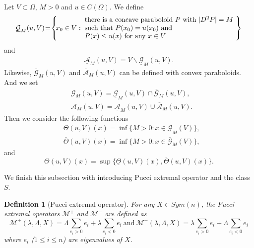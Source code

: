 \documentclass[11pt, reqno]{amsart}
\newtheorem{definition}[theorem]{Definition}
\numberwithin{equation}{section}
\begin{document}
Let $V \subset \Omega $, $M>0 $ and $u \in C(\Omega) $.
We define
\begin{align*}
 \underline{\mathcal{G}}_{M}(u, V) \hspace{-0.2em}=\hspace{-0.2em} \left\{ \hspace{-0.2em} x_{0} \in V : \hspace{-0.2em}  \begin{array}{ll}
 \textrm{there is a concave paraboloid $P$ with $|D^{2}P|=M$}\\
\textrm{such that $P(x_{0})=u(x_{0})$ and}\\
\textrm{$P(x)\le u(x)$ for any $x \in V$}
\end{array} \hspace{-0.2em}  \right\}
\end{align*}and
\begin{align*}
\underline{\mathcal{A}}_{M}(u, V) = V \backslash \underline{\mathcal{G}}_{M}(u, V) .
\end{align*}
Likewise, $ \overline{\mathcal{G}}_{M}(u, V)$ and $\overline{\mathcal{A}}_{M}(u, V) $ can be defined with convex paraboloids.
And we set
\begin{align*}&\mathcal{G}_{M}(u,V) =  \underline{\mathcal{G}}_{M}(u, V)  \cap \overline{\mathcal{G}}_{M}(u, V), \\
& \mathcal{A}_{M}(u,V)  =  \underline{\mathcal{A}}_{M}(u, V)  \cup \overline{\mathcal{A}}_{M}(u, V).
\end{align*}
Then we consider the following functions
\begin{align*} &\underline{\Theta}(u,V)(x) = \inf \{ M>0 :x \in \underline{\mathcal{G}}_{M}(V) \},
\\ & \overline{\Theta}(u,V)(x) = \inf \{ M>0 :x \in \overline{\mathcal{G}}_{M}(V) \},
\end{align*}
and
$$\Theta (u,V)(x) = \sup \{ \underline{\Theta}(u,V)(x) ,\overline{\Theta}(u,V)(x) \}. $$


We finish this subsection with introducing Pucci extremal operator and the class $S$.
\begin{definition}[Pucci extremal operator]
For any $X \in Sym(n) $, the Pucci extremal operators $ \mathcal{M}^{+} $ and  $\mathcal{M}^{-}$ are defined as
$$  \mathcal{M}^{+}(\lambda, \Lambda, X)=\Lambda \sum_{e_{i}>0} e_{i} + \lambda \sum_{e_{i}<0} e_{i} \ \textrm{and}\  \mathcal{M}^{-}(\lambda, \Lambda, X)=\lambda \sum_{e_{i}>0} e_{i} + \Lambda \sum_{e_{i}<0} e_{i} $$
where $ e_{i}$ ($1 \le i \le n $) are eigenvalues of $X$.
\end{definition}
\end{document}
